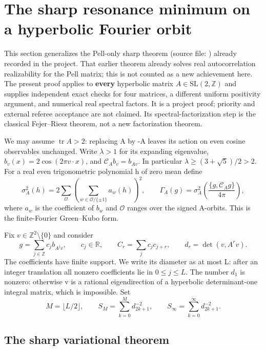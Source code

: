 \section{The sharp resonance minimum on a hyperbolic Fourier orbit}\label{sec:sharp}
This section generalizes the Pell-only sharp theorem (source file: ) already recorded in the project. That earlier theorem already solves real autocorrelation realizability for the Pell matrix; this is not counted as a new achievement here. The present proof applies to \textbf{every} hyperbolic matrix \(A\in\mathrm{SL}(2,\mathbb Z)\) and supplies independent exact checks for four matrices, a different uniform positivity argument, and numerical real spectral factors. It is a project proof; priority and external referee acceptance are not claimed. Its spectral-factorization step is the classical Fejer--Riesz theorem, not a new factorization theorem.

We may assume \(\operatorname{tr}A>2\): replacing A by -A leaves its action on even cosine observables unchanged. Write \(\lambda>1\) for its expanding eigenvalue, \(b_v(x)=2\cos(2\pi v\cdot x)\), and \(\mathcal C_A b_v=b_{Av}\). In particular \(\lambda\geq(3+\sqrt5)/2>2\). For a real even trigonometric polynomial h of zero mean define \[
 \sigma_A^2(h)=2\sum_{\mathcal O}
          \left(\sum_{w\in\mathcal O/\{\pm1\}}a_w(h)\right)^2,
 \qquad
 \Gamma_A(g)=\sigma_A^2\!\left(\frac{\{g,\mathcal C_Ag\}}{4\pi}\right),
\] where \(a_w\) is the coefficient of \(b_w\) and \(\mathcal O\) ranges over the signed A-orbits. This is the finite-Fourier Green--Kubo form.

Fix \(v\in\mathbb Z^2\setminus\{0\}\) and consider \[
 g=\sum_{j\in\mathbb Z}c_jb_{A^jv},\qquad c_j\in\mathbb R,
 \qquad C_r=\sum_jc_jc_{j+r},\qquad d_r=\det(v,A^rv).
\] The coefficients have finite support. We write its diameter as at most L: after an integer translation all nonzero coefficients lie in \(0\leq j\leq L\). The number \(d_1\) is nonzero: otherwise v is a rational eigendirection of a hyperbolic determinant-one integral matrix, which is impossible. Set \[
 M=\lfloor L/2\rfloor,\qquad
 S_M=\sum_{k=0}^M d_{2k+1}^{-2},\qquad
 S_\infty=\sum_{k=0}^{\infty}d_{2k+1}^{-2}.
\]

\subsection{The sharp variational theorem}\label{sharp:the-sharp-variational-theorem}

